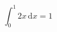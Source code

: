 \documentclass[varwidth]{standalone}
\begin{document}
\[\int_0^1 2x\,\mathrm{d}x=1\]
\end{document}
